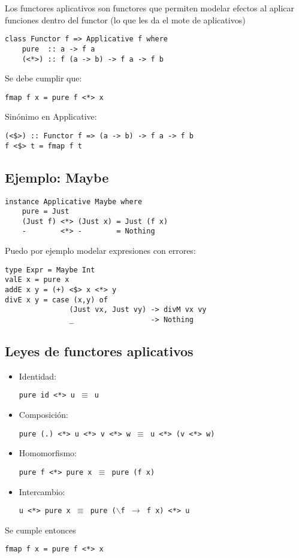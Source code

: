 \documentclass{article}
\newcommand{\imp}[1]{\textcolor{color1}{#1}}
\begin{document}
\noindent Los \imp{functores aplicativos} son functores que permiten modelar efectos al aplicar funciones dentro del functor (lo que les da el mote de aplicativos)

\begin{lstlisting}
class Functor f => Applicative f where
    pure  :: a -> f a
    (<*>) :: f (a -> b) -> f a -> f b
\end{lstlisting}

Se debe cumplir que:

\begin{lstlisting}
fmap f x = pure f <*> x
\end{lstlisting}

Sinónimo en \imp{Applicative}:

\begin{lstlisting}
(<$>) :: Functor f => (a -> b) -> f a -> f b
f <$> t = fmap f t
\end{lstlisting}

\subsection{Ejemplo: Maybe}

\begin{lstlisting}
instance Applicative Maybe where
    pure = Just
    (Just f) <*> (Just x) = Just (f x)
    -        <*> -        = Nothing
\end{lstlisting}

Puedo por ejemplo modelar expresiones con errores:

\begin{lstlisting}
type Expr = Maybe Int
valE x = pure x
addE x y = (+) <$> x <*> y
divE x y = case (x,y) of
               (Just vx, Just vy) -> divM vx vy
               _                  -> Nothing
\end{lstlisting}

\subsection{Leyes de functores aplicativos}

\begin{itemize}
\item Identidad:
\begin{center}
\texttt{pure id <*>~u $\equiv$ u}
\end{center}
\item Composición:
\begin{center}
\texttt{pure (.) <*>~u <*>~v <*>~w $\equiv$ u <*>~(v <*>~w)}
\end{center}
\item Homomorfismo:
\begin{center}
\texttt{pure f <*>~pure x $\equiv$ pure (f x)}
\end{center}
\item Intercambio:
\begin{center}
\texttt{u <*>~pure x $\equiv$ pure ($\backslash$f $\rightarrow$ f x) <*>~u}
\end{center}
\end{itemize}
Se cumple entonces
\begin{center}
\texttt{fmap~f~x = pure~f <*> x}
\end{center}
\end{document}
